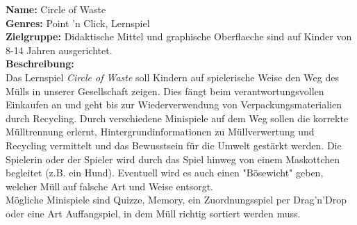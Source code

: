\documentclass[a4paper]{article}
\begin{document}
\textbf{Name:} Circle of Waste\\
\textbf{Genres:} Point 'n Click, Lernspiel\\
\textbf{Zielgruppe:} Didaktische Mittel und graphische Oberflaeche sind auf Kinder von 8-14 Jahren ausgerichtet.\\
\textbf{Beschreibung:} \\
Das Lernspiel \textit{Circle of Waste} soll Kindern auf spielerische Weise den Weg des Mülls in unserer Gesellschaft zeigen. Dies fängt beim verantwortungsvollen Einkaufen an und geht bis zur Wiederverwendung von Verpackungsmaterialien durch Recycling. Durch verschiedene Minispiele auf dem Weg sollen die korrekte Mülltrennung erlernt, Hintergrundinformationen zu Müllverwertung und Recycling vermittelt und das Bewusstsein für die Umwelt gestärkt werden. Die Spielerin oder der Spieler wird durch das Spiel hinweg von einem Maskottchen begleitet (z.B. ein Hund). Eventuell wird es auch einen "Bösewicht" geben, welcher Müll auf falsche Art und Weise entsorgt.\\
Mögliche Minispiele sind Quizze, Memory, ein Zuordnungsspiel per Drag'n'Drop oder eine Art Auffangspiel, in dem Müll richtig sortiert werden muss.
\end{document}
